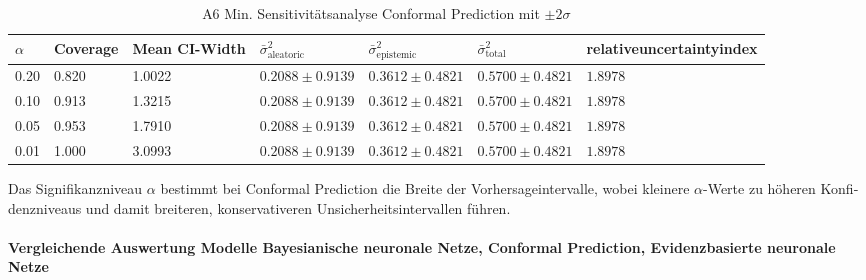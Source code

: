 \begin{otherlanguage}{ngerman}
\begin{table}[!htbp]
\centering
\footnotesize
\begin{tabularx}{\textwidth}{|X|X|X|X|X|X|X|}
\hline
\vspace{0.15em}$\alpha$\vspace{0.25em}
& \vspace{0.15em}Coverage\vspace{0.25em}
& \vspace{0.15em}Mean CI-Width\vspace{0.25em}
& \vspace{0.15em}$\bar{\sigma}^2_{\text{aleatoric}}$\vspace{0.25em}
& \vspace{0.15em}$\bar{\sigma}^2_{\text{epistemic}}$\vspace{0.25em}
& \vspace{0.15em}$\bar{\sigma}^2_{\text{total}}$\vspace{0.25em}
& \vspace{0.15em}\gls{relativeuncertaintyindex}\vspace{0.25em} \\
\hline
0.20 & 0.820 & 1.0022 & $0.2088 \pm 0.9139$ & $0.3612 \pm 0.4821$ & $0.5700 \pm 0.4821$ & $1.8978$ \\
\hline
0.10 & 0.913 & 1.3215 & $0.2088 \pm 0.9139$ & $0.3612 \pm 0.4821$ & $0.5700 \pm 0.4821$ & $1.8978$ \\
\hline
0.05 & 0.953 & 1.7910 & $0.2088 \pm 0.9139$ & $0.3612 \pm 0.4821$ & $0.5700 \pm 0.4821$ & $1.8978$ \\
\hline
0.01 & 1.000 & 3.0993 & $0.2088 \pm 0.9139$ & $0.3612 \pm 0.4821$ & $0.5700 \pm 0.4821$ & $1.8978$ \\
\hline
\end{tabularx}
\caption{A6 Min. Sensitivitätsanalyse \gls{Conformal Prediction} mit $\pm 2\sigma$}
\label{tab:cp_results}
\end{table}

Das Signifikanzniveau $\alpha$ bestimmt bei \gls{Conformal Prediction} die Breite der Vorhersageintervalle, wobei kleinere $\alpha$-Werte zu höheren Konfidenzniveaus und damit breiteren, konservativeren Unsicherheitsintervallen führen.



\paragraph{Vergleichende Auswertung Modelle \gls{Bayesianische neuronale Netze}, \gls{Conformal Prediction}, \gls{Evidenzbasierte neuronale Netze}}


\end{otherlanguage}
